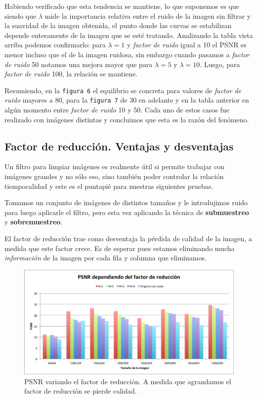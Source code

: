 \documentclass[a4paper]{article}
\begin{document}
Habiendo verificado que esta tendencia se mantiene, lo que suponemos es que siendo que $\lambda$ mide la importancia relativa entre el ruido de la imagen sin filtrar y la suavidad de la imagen obtenida, el punto donde las curvas se estabilizan depende enteramente de la imagen que se esté tratando. Analizando la tabla vista arriba podemos confirmarlo: para $\lambda = 1$ y \textit{factor de ruido} igual a 10 el PSNR es menor incluso que el de la imagen ruidosa, sin embargo cuando pasamos a \textit{factor de ruido} 50 notamos una mejora mayor que para $\lambda = 5$ y $\lambda = 10$. Luego, para \textit{factor de ruido} 100, la relación se mantiene. 

Resumiendo, en la \texttt{figura 6} el equilibrio se concreta para valores de \textit{factor de ruido} mayores a 80, para la \texttt{figura 7} de 30 en adelante y en la tabla anterior en algún momento entre \textit{factor de ruido} 10 y 50. Cada uno de estos casos fue realizado con imágenes distintas y concluimos que esta es la razón del fenómeno.

\subsection{Factor de reducción. Ventajas y desventajas}
Un filtro para limpiar imágenes es realmente útil si permite trabajar con imágenes grandes y no sólo eso, sino también poder controlar la relación tiempo\/calidad y este es el puntapié para nuestras siguientes pruebas.

Tomamos un conjunto de imágenes de distintos tamaños y le introdujimos ruido para luego aplicarle el filtro, pero esta vez aplicando la técnica de \textbf{submuestreo} y \textbf{sobremuestreo}.

El factor de reducción trae como desventaja la pérdida de calidad de la imagen, a medida que este factor crece. Es de esperar pues estamos eliminando mucha \textit{información} de la imagen por cada fila y columna que eliminamos.

\begin{figure}[H]
  \centering
  \includegraphics[scale=0.8]{graficos/PSNR_factor_reduccion.png}
  \caption{ PSNR variando el factor de reducción. A medida que agrandamos el factor de reducción se pierde calidad. }
\end{figure}
\end{document}
